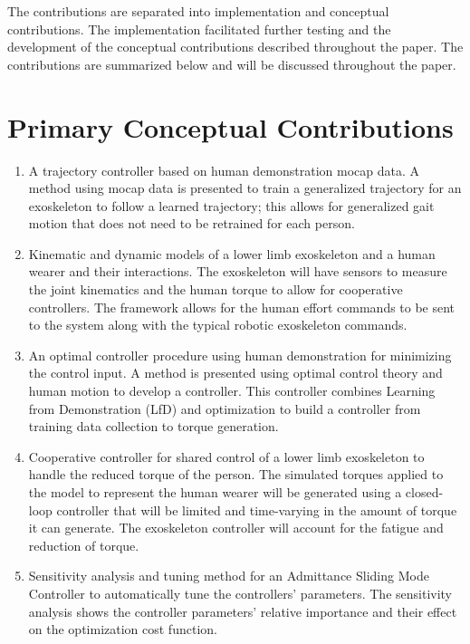 The contributions are separated into implementation and conceptual contributions. The implementation facilitated further testing and the development of the conceptual contributions described throughout the paper. The contributions are summarized below and will be discussed throughout the paper. 

\section{Primary Conceptual Contributions}
\begin{enumerate}[wide, nosep, labelindent = 0pt, topsep = 1ex]
     \item A trajectory controller based on human demonstration mocap data. A method using mocap data is presented to train a generalized trajectory for an exoskeleton to follow a learned trajectory; this allows for generalized gait motion that does not need to be retrained for each person. 
    \item Kinematic and dynamic models of a lower limb exoskeleton and a human wearer and their interactions. The exoskeleton will have sensors to measure the joint kinematics and the human torque to allow for cooperative controllers. The framework allows for the human effort commands to be sent to the system along with the typical robotic exoskeleton commands. 
    \item An optimal controller procedure using human demonstration for minimizing the control input. A method is presented using optimal control theory and human motion to develop a controller. This controller combines Learning from Demonstration (LfD) and optimization to build a controller from training data collection to torque generation. 
    \item Cooperative controller for shared control of a lower limb exoskeleton to handle the reduced torque of the person. The simulated torques applied to the model to represent the human wearer will be generated using a closed-loop controller that will be limited and time-varying in the amount of torque it can generate. The exoskeleton controller will account for the fatigue and reduction of torque. 
    \item Sensitivity analysis and tuning method for an Admittance Sliding Mode Controller to automatically tune the controllers' parameters. The sensitivity analysis shows the controller parameters' relative importance and their effect on the optimization cost function.  
\end{enumerate}

